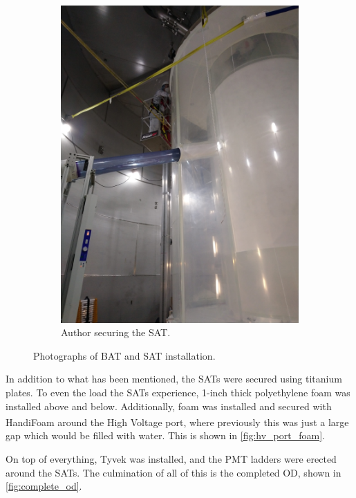 \begin{figure}[]
\begin{subfigure}{.5\textwidth}
  \includegraphics[angle=-90, width=\linewidth]{Figures/Construction/SAT_titanium_plate.JPG}
  \caption{Author securing the SAT.}
  \label{fig:SAT_titanium_installation}
  \end{subfigure}
\caption{Photographs of BAT and SAT installation.}
\label{fig:sat_and_bat_installation}
\end{figure}

\par
In addition to what has been mentioned, the SATs were secured using titanium plates.
To even the load the SATs experience, 1-inch thick polyethylene foam was installed above and below.
Additionally, foam was installed and secured with HandiFoam\textsuperscript{\textregistered} around the High Voltage port, where previously this was just a large gap which would be filled with water.
This is shown in \autoref{fig:hv_port_foam}.

\par
On top of everything, Tyvek was installed, and the PMT ladders were erected around the SATs.
The culmination of all of this is the completed OD, shown in \autoref{fig:complete_od}.

